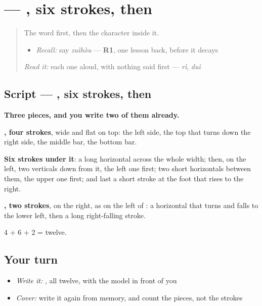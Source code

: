\section[\texorpdfstring{\zh{最} (zuì)}{最 (zuì)}]{ — , six strokes, then }

\label{lesson:ZH-W278-zui}



\begin{quote}
The word first, then the character inside it.

\begin{itemize}
\raggedright
  \item \emph{Recall:} say \emph{zuìhòu} — \textbf{R1}, one lesson back, before it decays
\end{itemize}

\begin{quote}
 
\end{quote}

\emph{Read it:} each one aloud, with nothing said first — \emph{rì}, \emph{duì}
\end{quote}

\subsection*{Script — , six strokes, then }

\begin{quote}
\end{quote}

\textbf{Three pieces, and you write two of them already.}

\textbf{, four strokes}, wide and flat on top: the left side, the top that turns down the right side, the middle bar, the bottom bar.

\textbf{Six strokes under it}: a long horizontal across the whole width; then, on the left, two verticals down from it, the left one first; two short horizontals between them, the upper one first; and last a short stroke at the foot that rises to the right.

\textbf{, two strokes}, on the right, as on the left of : a horizontal that turns and falls to the lower left, then a long right-falling stroke.

4 + 6 + 2 = twelve.

\subsection*{Your turn}
\begin{itemize}
\raggedright
  \item \emph{Write it:} , all twelve, with the model in front of you
  \item \emph{Cover:} write it again from memory, and count the pieces, not the strokes
\end{itemize}

